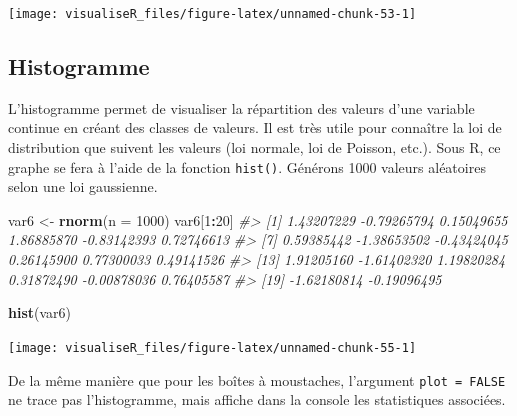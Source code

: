 \documentclass[]{article}
\newenvironment{Shaded}{\begin{snugshade}}{\end{snugshade}}
\newcommand{\CommentTok}[1]{\textcolor[rgb]{0.56,0.35,0.01}{\textit{#1}}}
\newcommand{\DataTypeTok}[1]{\textcolor[rgb]{0.13,0.29,0.53}{#1}}
\newcommand{\DecValTok}[1]{\textcolor[rgb]{0.00,0.00,0.81}{#1}}
\newcommand{\KeywordTok}[1]{\textcolor[rgb]{0.13,0.29,0.53}{\textbf{#1}}}
\newcommand{\NormalTok}[1]{#1}
\newcommand{\OperatorTok}[1]{\textcolor[rgb]{0.81,0.36,0.00}{\textbf{#1}}}
\newcommand{\StringTok}[1]{\textcolor[rgb]{0.31,0.60,0.02}{#1}}
\begin{document}
\begin{center}\texttt{[image: visualiseR\_files/figure-latex/unnamed-chunk-53-1]} \end{center}

\hypertarget{histogramme}{%
\subsection{Histogramme}\label{histogramme}}

L'histogramme permet de visualiser la répartition des valeurs d'une variable continue en créant des classes de valeurs. Il est très utile pour connaître la loi
de distribution que suivent les valeurs (loi normale, loi de Poisson, etc.). Sous R, ce graphe se fera à l'aide de la fonction \texttt{hist()}.
Générons 1000 valeurs aléatoires selon une loi gaussienne.

\begin{Shaded}
\begin{Highlighting}[]
\NormalTok{var6 <-}\StringTok{ }\KeywordTok{rnorm}\NormalTok{(}\DataTypeTok{n =} \DecValTok{1000}\NormalTok{)}
\NormalTok{var6[}\DecValTok{1}\OperatorTok{:}\DecValTok{20}\NormalTok{]}
\CommentTok{#>  [1]  1.43207229 -0.79265794  0.15049655  1.86885870 -0.83142393  0.72746613}
\CommentTok{#>  [7]  0.59385442 -1.38653502 -0.43424045  0.26145900  0.77300033  0.49141526}
\CommentTok{#> [13]  1.91205160 -1.61402320  1.19820284  0.31872490 -0.00878036  0.76405587}
\CommentTok{#> [19] -1.62180814 -0.19096495}
\end{Highlighting}
\end{Shaded}

\begin{Shaded}
\begin{Highlighting}[]
\KeywordTok{hist}\NormalTok{(var6)}
\end{Highlighting}
\end{Shaded}

\begin{center}\texttt{[image: visualiseR\_files/figure-latex/unnamed-chunk-55-1]} \end{center}

De la même manière que pour les boîtes à moustaches, l'argument \texttt{plot\ =\ FALSE} ne trace pas l'histogramme, mais affiche dans la console les statistiques associées.
\end{document}
